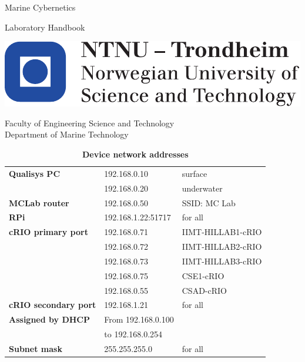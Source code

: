 \documentclass[a4paper,english]{report}
\begin{document}
\thispagestyle{empty}

\vspace*{3cm}

\begin{center}
{\LARGE{}Marine Cybernetics}
\par\end{center}{\LARGE \par}

\begin{center}
{\LARGE{}Laboratory Handbook }
\par\end{center}{\LARGE \par}

\begin{flushleft}
\vfill{}
\par\end{flushleft}

\begin{flushleft}
\includegraphics[scale=0.6]{fig/NTNU_logo.pdf}
\par\end{flushleft}

Faculty of Engineering Science and Technology\\
Department of Marine Technology

\clearpage{}\thispagestyle{empty}\vspace*{3cm}
\begin{table}[h!]
	\centering
	\caption*{\huge{\textbf{Device network addresses}}}
	\begin{tabular}{lll}
		\hline
		\textbf{Qualisys PC} & 192.168.0.10 & surface\\
		& 192.168.0.20 & underwater\\ \hline
		\textbf{MCLab router} & 192.168.0.50 & SSID: MC Lab\\ \hline
		\textbf{RPi} & 192.168.1.22:51717 & for all\\ \hline
		\textbf{cRIO primary port} & 192.168.0.71 & IIMT-HILLAB1-cRIO\\
		& 192.168.0.72 & IIMT-HILLAB2-cRIO\\
		& 192.168.0.73 & IIMT-HILLAB3-cRIO\\
		& 192.168.0.75 & CSE1-cRIO\\
		& 192.168.0.55 & CSAD-cRIO\\
		\textbf{cRIO secondary port} & 192.168.1.21 & for all\\ \hline
		\textbf{Assigned by DHCP} & From 192.168.0.100 & \\
		& to 192.168.0.254 & \\ \hline
		\textbf{Subnet mask} & 255.255.255.0 & for all\\ \hline
	\end{tabular}
\end{table}
\clearpage{}
\end{document}
